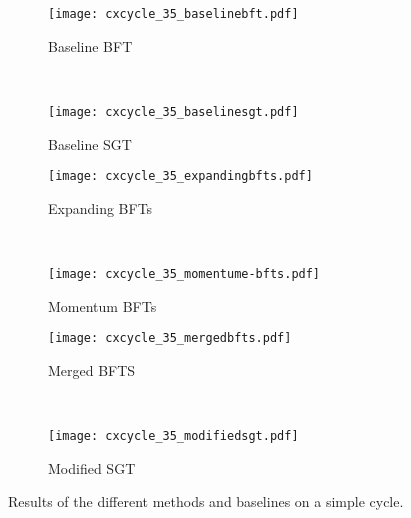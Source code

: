 \documentclass[a4paper,final,notitlepage,11pt,svgnames]{scrartcl}
\begin{document}
\begin{figure}[htpb]
	\centering
	\begin{subfigure}[b]{0.45\textwidth}
		\texttt{[image: cxcycle\_35\_baselinebft.pdf]}
		\caption{Baseline BFT}
	\end{subfigure}~
	\begin{subfigure}[b]{0.45\textwidth}
		\texttt{[image: cxcycle\_35\_baselinesgt.pdf]}
		\caption{Baseline SGT}
	\end{subfigure}

	\begin{subfigure}[b]{0.45\textwidth}
		\texttt{[image: cxcycle\_35\_expandingbfts.pdf]}
		\caption{Expanding BFTs}
	\end{subfigure}~
	\begin{subfigure}[b]{0.45\textwidth}
		\texttt{[image: cxcycle\_35\_momentume-bfts.pdf]}
		\caption{Momentum BFTs}
	\end{subfigure}

	\begin{subfigure}[b]{0.45\textwidth}
		\texttt{[image: cxcycle\_35\_mergedbfts.pdf]}
		\caption{Merged BFTS}
	\end{subfigure}~
	\begin{subfigure}[b]{0.45\textwidth}
		\texttt{[image: cxcycle\_35\_modifiedsgt.pdf]}
		\caption{Modified SGT}
	\end{subfigure}
	\caption{Results of the different methods and baselines on a simple
		cycle. \label{fig:rcycle}}
\end{figure}
\end{document}

